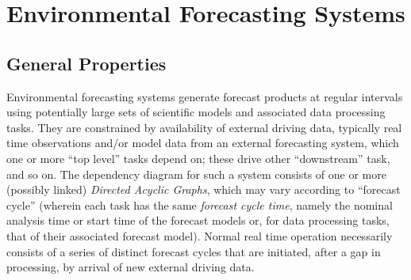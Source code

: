 \documentclass[11pt,a4paper]{article}
\begin{document}
\begin{abstract}
{    below).} This means that parallel test systems can be started (or
    restarted) behind the main operation to catch up as quickly as
    possible, systems with little downtime between forecast cycles will
    catch up from delays much faster, and historical case studies can
    achieve sustained maximal throughput. {\em Cylc} is easily
    interfaced to existing tasks and is extremely flexible and easy to
    use. It can be restarted in arbitrarily complex states of operation
    and dynamically adapts to insertion or removal of tasks.  A failed
    task will necessarily delay its downstream dependants, but the rest
    of the system can carry on unaffected while the problem is
    addressed, after which time the delayed tasks will catch up as
    quickly as possible.  {\em Cylc}'s handling of forecast model
    `restart' dependencies allows continued operation, with very little
    operator intervention, over major failures that result in omitted
    forecast cycles in the driving (upstream) models.  Ability to
    control the configured task set, and failure recovery scenarios, can
    be completely tested in an accelerated simulation mode that is
    indistinguishable (to {\em cylc}) from real operation.  {\em Cylc}
    is written in object oriented Python and uses the Python Remote
    Object Protocol ({\em Pyro}) to control tasks across a network.  

\end{abstract}

\section{Environmental Forecasting Systems}
\label{sec:FS}

\subsection{General Properties}

Environmental forecasting systems generate forecast products at regular
intervals using potentially large sets of scientific models and
associated data processing tasks. They are constrained by availability
of external driving data, typically real time observations and/or model
data from an external forecasting system, which one or more ``top
level'' tasks depend on; these drive other ``downstream'' task, and so
on. The dependency diagram for such a system consists of one or more
(possibly linked) {\em Directed Acyclic Graphs}, which may vary
according to ``forecast cycle'' (wherein each task has the same {\em
forecast cycle time}, namely the nominal analysis time or start time
of the forecast models or, for data processing tasks, that of their
associated forecast model). Normal real time operation necessarily
consists of a series of distinct forecast cycles that are initiated,
after a gap in processing, by arrival of new external driving data.
\end{document}
